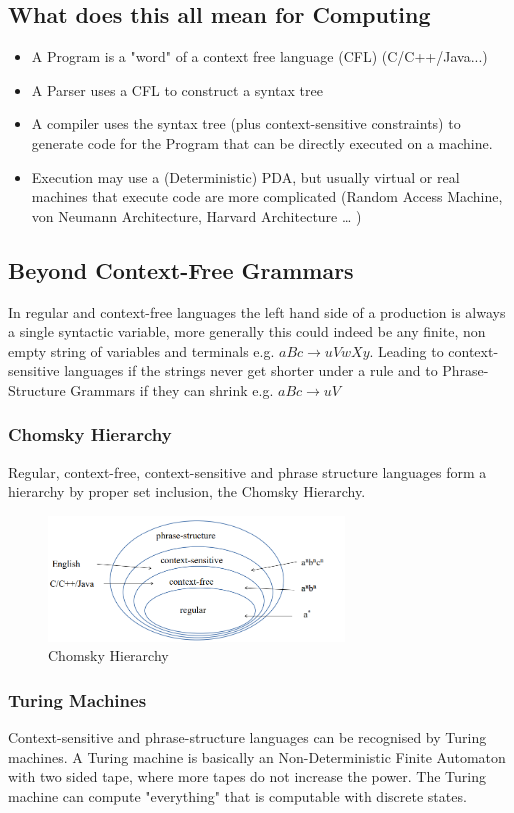 \subsection{What does this all mean for Computing}
\begin{itemize}
    \item A Program is a "word" of a context free language (CFL) (C/C++/Java...)
    \item A Parser uses a CFL to construct a syntax tree
    \item A compiler uses the syntax tree (plus context-sensitive constraints) to generate code for the Program that can be directly executed on a machine.
    \item Execution may use a (Deterministic) PDA, but usually virtual or real machines that execute code are more complicated (Random Access Machine, von Neumann Architecture, Harvard Architecture … )
\end{itemize}
\subsection{Beyond Context-Free Grammars}
In regular and context-free languages the left hand side of a production is always a single syntactic variable, more generally this could indeed be any finite, non empty string of variables and terminals e.g. $aBc \rightarrow uVwXy$. Leading to context-sensitive languages if the strings never get shorter under a rule and to Phrase-Structure Grammars if they can shrink e.g. $aBc \rightarrow uV$
\subsubsection{Chomsky Hierarchy}
Regular, context-free, context-sensitive and phrase structure languages form a hierarchy by proper set inclusion, the Chomsky Hierarchy.
\begin{figure}[h]
    \centering
    \includegraphics[width = 0.7\textwidth]{Images/ChomskyHierarchy.PNG}
    \caption{Chomsky Hierarchy}
    \label{fig:ChomskyHierarchy}
\end{figure}
\subsubsection{Turing Machines}
Context-sensitive and phrase-structure languages can be recognised by Turing machines. A Turing machine is basically an Non-Deterministic Finite Automaton with two sided tape, where more tapes do not increase the power. The Turing machine can compute "everything" that is computable with discrete states.
